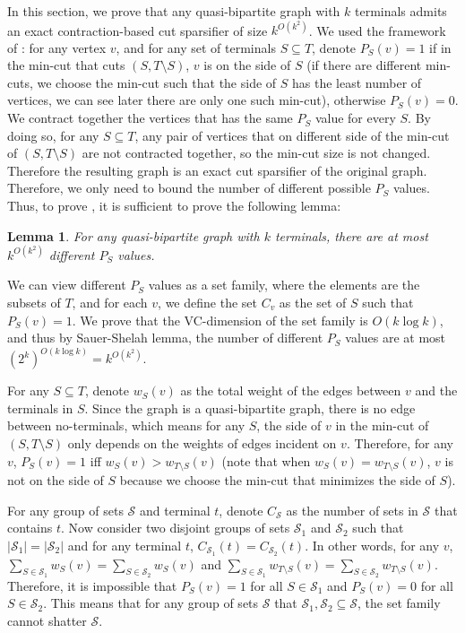 \documentclass[11pt]{article}
\newtheorem{lemma}[theorem]{Lemma}
\theoremstyle{definition}
\def\card#1{\left| #1 \right|}
\newcounter{note}
\begin{document}
\iffalse
In this section, we prove that any quasi-bipartite graph with $k$ terminals admits an exact contraction-based cut sparsifier of size $k^{O(k^2)}$. We used the framework of \cite{khan2014mimicking}: for any vertex $v$, and for any set of terminals $S \subseteq T$, denote $P_S(v)=1$ if in the min-cut that cuts $(S,T \setminus S)$, $v$ is on the side of $S$ (if there are different min-cuts, we choose the min-cut such that the side of $S$ has the least number of vertices, we can see later there are only one such min-cut), otherwise $P_S(v)=0$. We contract together the vertices that has the same $P_S$ value for every $S$. By doing so, for any $S \subseteq T$, any pair of vertices that on different side of the min-cut of $(S, T \setminus S)$ are not contracted together, so the min-cut size is not changed. Therefore the resulting graph is an exact cut sparsifier of the original graph. Therefore, we only need to bound the number of different possible $P_S$ values. Thus, to prove , it is sufficient to prove the following lemma:

\begin{lemma} \label{quasi_profile}
    For any quasi-bipartite graph with $k$ terminals, there are at most $k^{O(k^2)}$ different $P_S$ values.
\end{lemma}

We can view different $P_S$ values as a set family, where the elements are the subsets of $T$, and for each $v$, we define the set $C_v$ as the set of $S$ such that $P_S(v)=1$. We prove that the VC-dimension of the set family is $O(k \log k)$, and thus by Sauer-Shelah lemma, the number of different $P_S$ values are at most $(2^k)^{O(k \log k)} = k^{O(k^2)}$.  

For any $S \subseteq T$, denote $w_S(v)$ as the total weight of the edges between $v$ and the terminals in $S$. Since the graph is a quasi-bipartite graph, there is no edge between no-terminals, which means for any $S$, the side of $v$ in the min-cut of $(S,T \setminus S)$ only depends on the weights of edges incident on $v$. Therefore, for any $v$, $P_S(v)=1$ iff $w_S(v) > w_{T \setminus S}(v)$ (note that when $w_S(v) = w_{T \setminus S}(v)$, $v$ is not on the side of $S$ because we choose the min-cut that minimizes the side of $S$). 

For any group of sets $\mathcal{S}$ and terminal $t$, denote $C_{\mathcal{S}}$ as the number of sets in $\mathcal{S}$ that contains $t$. Now consider two disjoint groups of sets $\mathcal{S}_1$ and $\mathcal{S}_2$ such that $\card{\mathcal{S}_1} = \card{\mathcal{S}_2}$ and for any terminal $t$, $C_{\mathcal{S}_1}(t)=C_{\mathcal{S}_2}(t)$. In other words, for any $v$, $\sum_{S\in \mathcal{S}_1} w_{S}(v) = \sum_{S \in \mathcal{S}_2} w_{S}(v)$ and $\sum_{S \in \mathcal{S}_1} w_{T \setminus S}(v) = \sum_{S \in \mathcal{S}_2} w_{T \setminus S}(v)$. Therefore, it is impossible that $P_{S}(v)=1$ for all $S \in \mathcal{S}_1$ and $P_{S}(v)=0$ for all $S \in \mathcal{S}_2$. This means that for any group of sets $\mathcal{S}$ that $\mathcal{S}_1,\mathcal{S}_2 \subseteq \mathcal{S}$, the set family cannot shatter $\mathcal{S}$.
\end{document}
